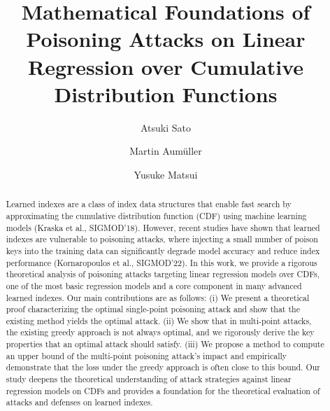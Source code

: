 \documentclass[acmsmall]{acmart}
\begin{document}
\title{Mathematical Foundations of Poisoning Attacks on Linear Regression over Cumulative Distribution Functions}

\author{Atsuki Sato}

\author{Martin Aum\"uller}

\author{Yusuke Matsui}

\renewcommand{\shortauthors}{Atsuki Sato, Martin Aum\"uller, and Yusuke Matsui}

\begin{abstract}
Learned indexes are a class of index data structures that enable fast search by approximating the cumulative distribution function (CDF) using machine learning models (Kraska et al., SIGMOD'18). However, recent studies have shown that learned indexes are vulnerable to poisoning attacks, where injecting a small number of poison keys into the training data can significantly degrade model accuracy and reduce index performance (Kornaropoulos et al., SIGMOD'22). In this work, we provide a rigorous theoretical analysis of poisoning attacks targeting linear regression models over CDFs, one of the most basic regression models and a core component in many advanced learned indexes. Our main contributions are as follows: (i) We present a theoretical proof characterizing the optimal single-point poisoning attack and show that the existing method yields the optimal attack. (ii) We show that in multi-point attacks, the existing greedy approach is not always optimal, and we rigorously derive the key properties that an optimal attack should satisfy. (iii) We propose a method to compute an upper bound of the multi-point poisoning attack's impact and empirically demonstrate that the loss under the greedy approach is often close to this bound. Our study deepens the theoretical understanding of attack strategies against linear regression models on CDFs and provides a foundation for the theoretical evaluation of attacks and defenses on learned indexes.
\end{abstract}
\end{document}
